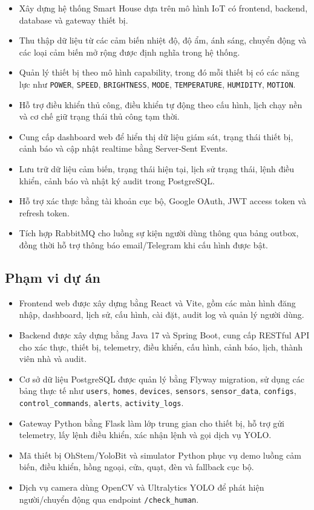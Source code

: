 \begin{itemize}
    \item Xây dựng hệ thống Smart House dựa trên mô hình IoT có frontend, backend, database và gateway thiết bị.
    \item Thu thập dữ liệu từ các cảm biến nhiệt độ, độ ẩm, ánh sáng, chuyển động và các loại cảm biến mở rộng được định nghĩa trong hệ thống.
    \item Quản lý thiết bị theo mô hình capability, trong đó mỗi thiết bị có các năng lực như \texttt{POWER}, \texttt{SPEED}, \texttt{BRIGHTNESS}, \texttt{MODE}, \texttt{TEMPERATURE}, \texttt{HUMIDITY}, \texttt{MOTION}.
    \item Hỗ trợ điều khiển thủ công, điều khiển tự động theo cấu hình, lịch chạy nền và cơ chế giữ trạng thái thủ công tạm thời.
    \item Cung cấp dashboard web để hiển thị dữ liệu giám sát, trạng thái thiết bị, cảnh báo và cập nhật realtime bằng Server-Sent Events.
    \item Lưu trữ dữ liệu cảm biến, trạng thái hiện tại, lịch sử trạng thái, lệnh điều khiển, cảnh báo và nhật ký audit trong PostgreSQL.
    \item Hỗ trợ xác thực bằng tài khoản cục bộ, Google OAuth, JWT access token và refresh token.
    \item Tích hợp RabbitMQ cho luồng sự kiện người dùng thông qua bảng outbox, đồng thời hỗ trợ thông báo email/Telegram khi cấu hình được bật.
\end{itemize}

\subsection{Phạm vi dự án}

\begin{itemize}
    \item Frontend web được xây dựng bằng React và Vite, gồm các màn hình đăng nhập, dashboard, lịch sử, cấu hình, cài đặt, audit log và quản lý người dùng.
    \item Backend được xây dựng bằng Java 17 và Spring Boot, cung cấp RESTful API cho xác thực, thiết bị, telemetry, điều khiển, cấu hình, cảnh báo, lịch, thành viên nhà và audit.
    \item Cơ sở dữ liệu PostgreSQL được quản lý bằng Flyway migration, sử dụng các bảng thực tế như \texttt{users}, \texttt{homes}, \texttt{devices}, \texttt{sensors}, \texttt{sensor\_data}, \texttt{configs}, \texttt{control\_commands}, \texttt{alerts}, \texttt{activity\_logs}.
    \item Gateway Python bằng Flask làm lớp trung gian cho thiết bị, hỗ trợ gửi telemetry, lấy lệnh điều khiển, xác nhận lệnh và gọi dịch vụ YOLO.
    \item Mã thiết bị OhStem/YoloBit và simulator Python phục vụ demo luồng cảm biến, điều khiển, hồng ngoại, cửa, quạt, đèn và fallback cục bộ.
    \item Dịch vụ camera dùng OpenCV và Ultralytics YOLO để phát hiện người/chuyển động qua endpoint \texttt{/check\_human}.
\end{itemize}

